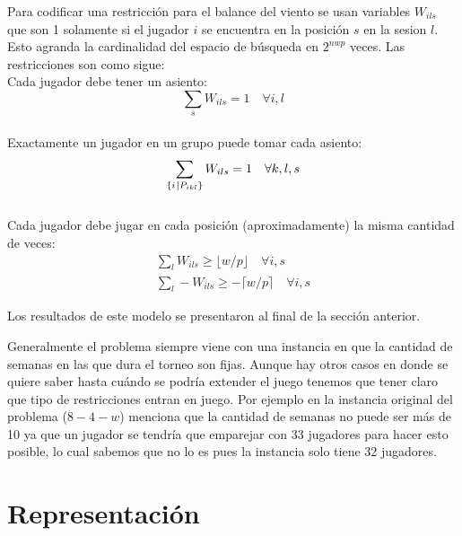 \documentclass[letter, 10pt]{article}
\begin{document}
Para codificar una restricción para el balance del viento se usan variables $W_{ils}$ que son 1 solamente si el jugador $i$ se encuentra en la posición $s$ en la sesion $l$. Esto agranda la cardinalidad del espacio de búsqueda en $2^{nwp}$ veces. Las restricciones son como sigue:\\
Cada jugador debe tener un asiento:
\begin{equation}
    \sum_s W_{ils} = 1 \quad \forall i,l
    \label{eq:21}
\end{equation}
\\
Exactamente un jugador en un grupo puede tomar cada asiento:
\begin{equation}
    \sum_{\{i \hspace{2pt} \vline \hspace{1pt} P_{ikl}\}} W_{ils} = 1 \quad \forall k,l,s
    \label{eq:22}
\end{equation}
\\
Cada jugador debe jugar en cada posición (aproximadamente) la misma cantidad de veces:
\begin{equation}
\begin{aligned}
    \sum_{l} W_{ils} \geq \lfloor w/p \rfloor \quad \forall i,s \\
    \sum_{l} -W_{ils} \geq -\lceil w/p \rceil \quad \forall i,s
    \label{eq:23}
\end{aligned} 
\end{equation}

Los resultados de este modelo se presentaron al final de la sección anterior.

Generalmente el problema siempre viene con una instancia en que la cantidad de semanas en las que dura el torneo son fijas. Aunque hay otros casos en donde se quiere saber hasta cuándo se podría extender el juego tenemos que tener claro que tipo de restricciones entran en juego. Por ejemplo en la instancia original del problema ($8-4-w$) \cite{triska2012effective} menciona que la cantidad de semanas no puede ser más de 10 ya que un jugador se tendría que emparejar con 33 jugadores para hacer esto posible, lo cual sabemos que no lo es pues la instancia solo tiene 32 jugadores.

\section{Representación} \label{rep}
\end{document}
